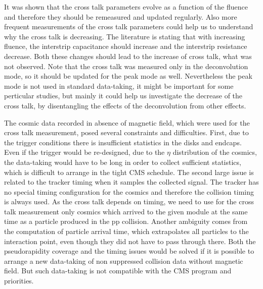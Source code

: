 It was shown that the cross talk parameters evolve as a function of the fluence and therefore they should be remeasured and updated regularly. Also more frequent measurements of the cross talk parameters could help us to understand why the cross talk is decreasing. The literature is stating that with increasing fluence, the interstrip capacitance should increase and the interstrip resistance decrease. Both these changes should lead to the increase of cross talk, what was not observed. Note that the cross talk was measured only in the deconvolution mode, so it should be  updated for the peak mode as well. Nevertheless the peak mode is not used in standard data-taking, it might be important for some perticular studies, but mainly it could help us investigate the decrease of the cross talk, by disentangling the effects of the deconvolution from other effects.

The cosmic data recorded in absence of magnetic field, which were used for the cross talk measurement, posed several constraints and difficulties. First, due to the trigger conditions there is insufficient statistics in the disks and endcaps. Even if the trigger would be re-designed, due to the $\eta$ distribution of the cosmics, the data-taking would have to be long in order to collect sufficient statistics, which is difficult to arrange in the tight CMS schedule. The second large issue is related to the tracker timing when it samples the collected signal. The tracker has no special timing configuration for the cosmics and therefore the collision timing is always used.  As the cross talk depends on timing, we need to use for the cross talk measurement only cosmics which arrived to the given module at the same time as a particle produced in the pp collision. Another ambiguity comes from the computation of particle arrival time, which extrapolates all particles to the interaction point, even though they did not have to pass through there. Both the pseudorapidity coverage and the timing issues would be solved if it is possible to arrange a new data-taking of non suppressed collision data without magnetic field. But such data-taking is not compatible with the CMS program and priorities.



